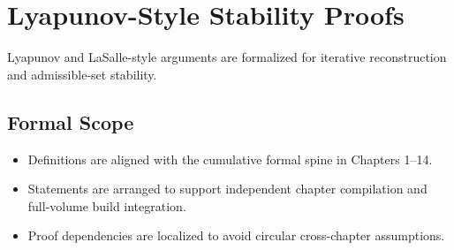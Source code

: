 \documentclass[../../clio.tex]{subfiles}
\begin{document}
\chapter{Lyapunov-Style Stability Proofs}
\label{apx:d-stability}

Lyapunov and LaSalle-style arguments are formalized for iterative reconstruction and admissible-set stability.

\section{Formal Scope}
\begin{itemize}
  \item Definitions are aligned with the cumulative formal spine in Chapters 1--14.
  \item Statements are arranged to support independent chapter compilation and full-volume build integration.
  \item Proof dependencies are localized to avoid circular cross-chapter assumptions.
\end{itemize}
\end{document}
